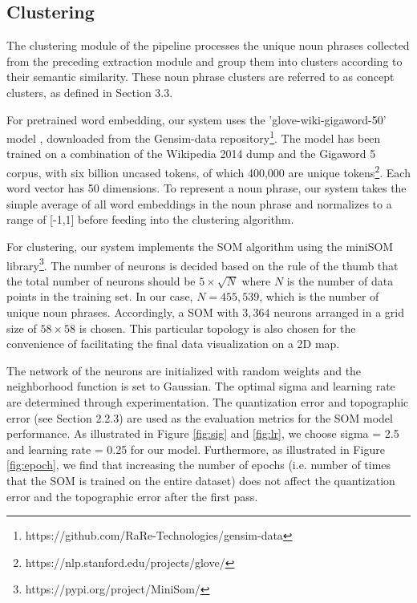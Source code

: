 \subsection{Clustering}
The clustering module of the pipeline processes the unique noun phrases collected from the preceding extraction module and group them into clusters according to their semantic similarity. These noun phrase clusters are referred to as concept clusters, as defined in Section 3.3.

For pretrained word embedding, our system uses the 'glove-wiki-gigaword-50' model \cite{glove2014}, downloaded from the Gensim-data repository\footnote{https://github.com/RaRe-Technologies/gensim-data}. The model has been trained on a combination of the Wikipedia 2014 dump and the Gigaword 5 corpus, with six billion uncased tokens, of which 400,000 are unique tokens\footnote{https://nlp.stanford.edu/projects/glove/}. Each word vector has 50 dimensions. To represent a noun phrase, our system takes the simple average of all word embeddings in the noun phrase and normalizes to a range of [-1,1] before feeding into the clustering algorithm.

For clustering, our system implements the SOM algorithm using the miniSOM library\footnote{ https://pypi.org/project/MiniSom/}. The number of neurons is decided based on the rule of the thumb \cite{SOM2019, SOM2014} that the total number of neurons should be $5\times \sqrt{N}$ where $N$ is the number of data points in the training set. In our case, $N = 455,539$, which is the number of unique noun phrases. Accordingly, a SOM with $3,364$ neurons arranged in a grid size of $58 \times 58$ is chosen. This particular topology is also chosen for the convenience of facilitating the final data visualization on a 2D map.

The network of the neurons are initialized with random weights and the neighborhood function is set to Gaussian. The optimal sigma and learning rate are determined through experimentation. The quantization error and topographic error (see Section 2.2.3) are used as the evaluation metrics for the SOM model performance. As illustrated in Figure \ref{fig:sig} and \ref{fig:lr}, we choose sigma = 2.5 and learning rate = 0.25 for our model. Furthermore, as illustrated in Figure \ref{fig:epoch}, we find that increasing the number of epochs (i.e. number of times that the SOM is trained on the entire dataset) does not affect the quantization error and the topographic error after the first pass. 

